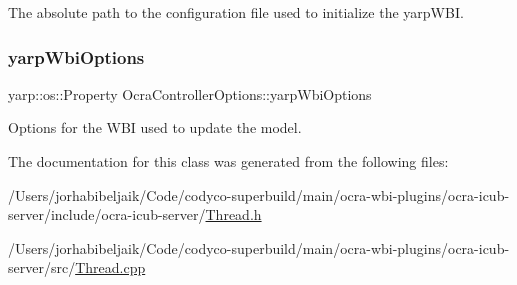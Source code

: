 The absolute path to the configuration file used to initialize the yarp\+W\+BI. \hypertarget{classOcraControllerOptions_ac3965bdcce6cb2ce3e4a335f855acd63}{}\label{classOcraControllerOptions_ac3965bdcce6cb2ce3e4a335f855acd63} 
\subsubsection{\texorpdfstring{yarp\+Wbi\+Options}{yarpWbiOptions}}
{\footnotesize\ttfamily yarp\+::os\+::\+Property Ocra\+Controller\+Options\+::yarp\+Wbi\+Options}

Options for the W\+BI used to update the model. 

The documentation for this class was generated from the following files\+:\begin{DoxyCompactItemize}
\item 
/\+Users/jorhabibeljaik/\+Code/codyco-\/superbuild/main/ocra-\/wbi-\/plugins/ocra-\/icub-\/server/include/ocra-\/icub-\/server/\hyperlink{Thread_8h}{Thread.\+h}\item 
/\+Users/jorhabibeljaik/\+Code/codyco-\/superbuild/main/ocra-\/wbi-\/plugins/ocra-\/icub-\/server/src/\hyperlink{Thread_8cpp}{Thread.\+cpp}\end{DoxyCompactItemize}
